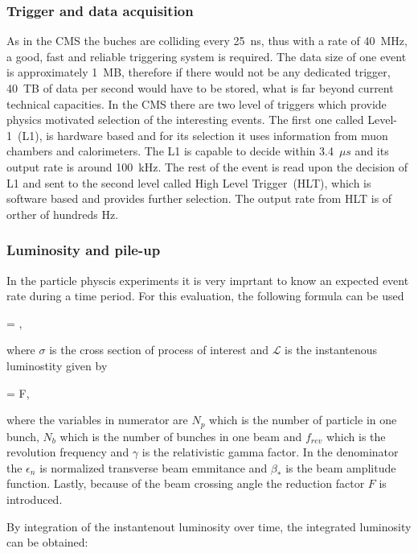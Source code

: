 \subsubsection{Trigger and data acquisition}

As in the CMS the buches are colliding every 25~ns, thus with a rate of 40~MHz, a good, fast and reliable triggering system is required. The data size of one event is approximately 1~MB, therefore if there would not be any dedicated trigger, 40~TB of data per second would have to be stored, what is far beyond current technical capacities. In the CMS there are two level of triggers which provide physics motivated selection of the interesting events. The first one called Level-1~(L1), is hardware based and for its selection it uses information from muon chambers and calorimeters. The L1 is capable to decide within 3.4~$\mu s$ and its output rate is around 100~kHz. The rest of the event is read upon the decision of L1 and sent to the second level called High Level Trigger~(HLT), which is software based and provides further selection. The output rate from HLT is of orther of hundreds Hz.

\subsubsection{Luminosity and pile-up}

In the particle physcis experiments it is very imprtant to know an expected event rate during a time period. For this evaluation, the following formula can be used

{
  = \sigma \times {},
}

where $\sigma$ is the cross section of process of interest and $\mathcal{L}$ is the instantenous luminostity given by

{
  = F,
}

where the variables in numerator are $N_{p}$ which is the number of particle in one bunch, $N_{b}$ which is the number of bunches in one beam and $f_{rev}$ which is the revolution frequency and $\gamma$ is the relativistic gamma factor. In the denominator the $\epsilon_{n}$ is normalized transverse beam emmitance and $\beta_{*}$ is the beam amplitude function. Lastly, because of the beam crossing angle the reduction factor $F$ is introduced.

By integration of the instantenout luminosity over time, the integrated luminosity can be obtained:

